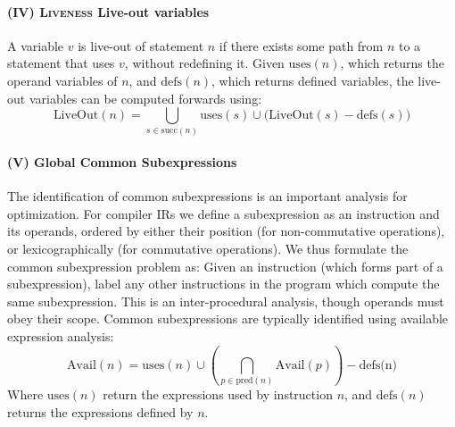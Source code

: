 \paragraph{(IV) \textsc{Liveness} Live-out variables} A variable $v$ is live-out
of statement $n$ if there exists some path from $n$ to a statement that uses
$v$, without redefining it. Given $\text{uses}(n)$, which returns the operand
variables of $n$, and $\text{defs}(n)$, which returns defined variables, the
live-out variables can be computed forwards using:
\begin{equation*}
  \text{LiveOut}(n) = \bigcup_{s \in \text{succ}(n)} \text{uses}(s) \cup \big(  \text{LiveOut}(s) - \text{defs}(s) \big)
\end{equation*}

\paragraph{(V) Global Common Subexpressions} The identification of common
subexpressions is an important analysis for optimization. For compiler IRs we
define a subexpression as an instruction and its operands, ordered by either
their position (for non-commutative operations), or lexicographically (for
commutative operations). We thus formulate the common subexpression problem as:
Given an instruction (which forms part of a subexpression), label any other
instructions in the program which compute the same subexpression. This is an
inter-procedural analysis, though operands must obey their scope. Common
subexpressions are typically identified using available expression analysis:
\begin{equation*}
  \text{Avail}(n) = \text{uses}(n) \cup \left( \bigcap_{p \in \text{pred}(n)} \text{Avail}(p) \right) - \text{defs(n)}
\end{equation*}
Where $\text{uses}(n)$ return the expressions used by instruction $n$, and
$\text{defs}(n)$ returns the expressions defined by $n$.
